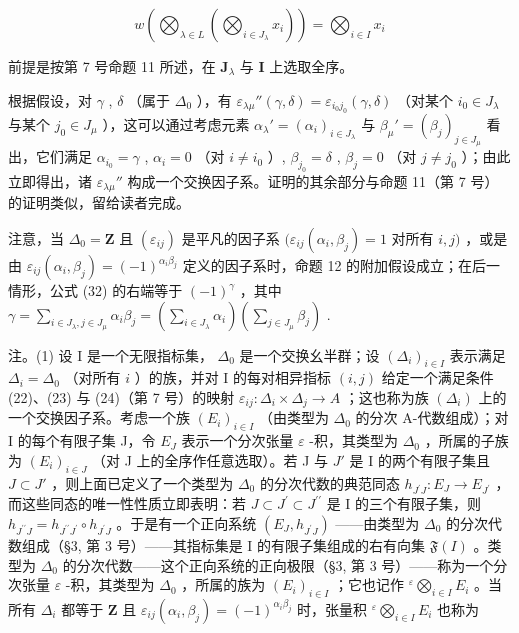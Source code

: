 \[
w \left(\bigotimes_ {\lambda \in L} \left(\bigotimes_ {i \in J _ {\lambda}} x _ {i}\right)\right) = \bigotimes_ {i \in I} x _ {i}\tag{35}
\]

前提是按第 7 号命题 11 所述，在 \(\mathbf{J}_{\lambda}\) 与 \(\mathbf{I}\) 上选取全序。

根据假设，对 \(\gamma\) , \(\delta\) （属于 \(\Delta_0\) ），有 \(\varepsilon_{\lambda \mu}''(\gamma, \delta) = \varepsilon_{i_0 j_0}(\gamma, \delta)\) （对某个 \(i_0 \in J_\lambda\) 与某个 \(j_0 \in J_\mu\) ），这可以通过考虑元素 \(\alpha_\lambda' = (\alpha_i)_{i \in J_\lambda}\) 与 \(\beta_\mu' = (\beta_j)_{j \in J_\mu}\) 看出，它们满足 \(\alpha_{i_0} = \gamma\) , \(\alpha_i = 0\) （对 \(i \neq i_0\) ）, \(\beta_{j_0} = \delta\) , \(\beta_j = 0\) （对 \(j \neq j_0\) ）；由此立即得出，诸 \(\varepsilon_{\lambda \mu}''\) 构成一个交换因子系。证明的其余部分与命题 11（第 7 号）的证明类似，留给读者完成。

注意，当 \(\Delta_0 = \mathbf{Z}\) 且 \((\varepsilon_{ij})\) 是平凡的因子系 \((\varepsilon_{ij}(\alpha_i,\beta_j) = 1\) 对所有 \(i,j)\) ，或是由 \(\varepsilon_{ij}(\alpha_i,\beta_j) = (-1)^{\alpha_i\beta_j}\) 定义的因子系时，命题 12 的附加假设成立；在后一情形，公式 (32) 的右端等于 \((-1)^{\gamma}\) ，其中 \(\gamma = \sum_{i\in J_{\lambda},j\in J_{\mu}}\alpha_{i}\beta_{j} = \left(\sum_{i\in J_{\lambda}}\alpha_{i}\right)\left(\sum_{j\in J_{\mu}}\beta_{j}\right)\) .

注。(1) 设 I 是一个无限指标集， \(\Delta_0\) 是一个交换幺半群；设 \((\Delta_i)_{i \in I}\) 表示满足 \(\Delta_i = \Delta_0\) （对所有 \(i\) ）的族，并对 I 的每对相异指标 \((i,j)\) 给定一个满足条件 (22)、(23) 与 (24)（第 7 号）的映射 \(\varepsilon_{ij} : \Delta_i \times \Delta_j \to A\) ；这也称为族 \((\Delta_i)\) 上的一个交换因子系。考虑一个族 \((E_i)_{i \in I}\) （由类型为 \(\Delta_0\) 的分次 A-代数组成）；对 I 的每个有限子集 J，令 \(E_J\) 表示一个分次张量 \(\varepsilon\) -积，其类型为 \(\Delta_0\) ，所属的子族为 \((E_i)_{i \in J}\) （对 J 上的全序作任意选取）。若 J 与 \(J'\) 是 I 的两个有限子集且 \(J \subset J'\) ，则上面已定义了一个类型为 \(\Delta_0\) 的分次代数的典范同态 \(h_{J^{\prime}J}:E_{J}\to E_{J^{\prime}}\) ，而这些同态的唯一性性质立即表明：若 \(J\subset J^{\prime}\subset J^{\prime\prime}\) 是 I 的三个有限子集，则 \(h_{J^{\prime\prime}J}=h_{J^{\prime\prime}J^{\prime}}\circ h_{J^{\prime}J}\) 。于是有一个正向系统 \((E_{J},h_{J^{\prime}J})\) ——由类型为 \(\Delta_{0}\) 的分次代数组成（§3, 第 3 号）——其指标集是 I 的有限子集组成的右有向集 \(\mathfrak{F}(I)\) 。类型为 \(\Delta_{0}\) 的分次代数——这个正向系统的正向极限（§3, 第 3 号）——称为一个分次张量 \(\varepsilon\) -积，其类型为 \(\Delta_{0}\) ，所属的族为 \((E_{i})_{i\in I}\) ；它也记作 \({}^{\varepsilon}\bigotimes_{i\in I}E_{i}\) 。当所有 \(\Delta_{i}\) 都等于 \(\mathbf{Z}\) 且 \(\varepsilon_{ij}(\alpha_{i},\beta_{j})=(-1)^{\alpha_{i}\beta_{j}}\) 时，张量积 \({}^{\varepsilon}\bigotimes_{i\in I}E_{i}\) 也称为

